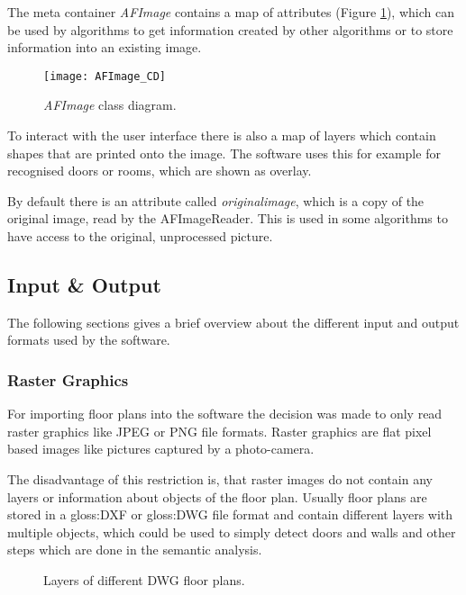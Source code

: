 The meta container \textit{AFImage} contains a map of attributes (Figure \ref{fig:AFImage_CD}), which can be used by algorithms to get information created by other algorithms or to store information into an existing image.

\begin{figure}[H]
  \centering
      \texttt{[image: AFImage\_CD]}
  \caption{\textit{AFImage} class diagram.}
  \label{fig:AFImage_CD}
\end{figure}

To interact with the user interface there is also a map of layers which contain shapes that are printed onto the image. The software uses this for example for recognised doors or rooms, which are shown as overlay.

By default there is an attribute called \textit{originalimage}, which is a copy of the original image, read by the AFImageReader. This is used in some algorithms to have access to the original, unprocessed picture.

\subsection{Input \& Output}
\label{sub:ImportExport}
The following sections gives a brief overview about the different input and output formats used by the software.

\subsubsection{Raster Graphics}
For importing floor plans into the software the decision was made to only read raster graphics like JPEG or PNG file formats. Raster graphics are flat pixel based images like pictures captured by a photo-camera.

The disadvantage of this restriction is, that raster images do not contain any layers or information about objects of the floor plan. Usually floor plans are stored in a \gls{gloss:DXF} or \gls{gloss:DWG} file format and contain different layers with multiple objects, which could be used to simply detect doors and walls and other steps which are done in the semantic analysis.

\begin{figure}[H]
	\centering
	\hfill
	\hfill
	\caption{Layers of different DWG floor plans. }
	\label{fig:layer_comparison}
\end{figure}

